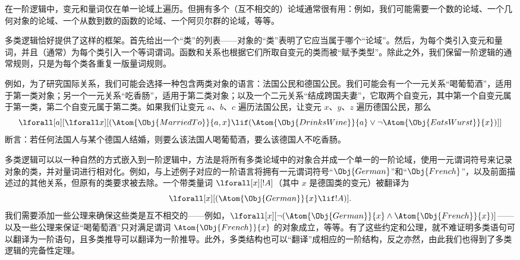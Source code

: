 \documentclass[../../../include/open-logic-section]{subfiles}
\begin{document}



在一阶逻辑中，变元和量词仅在单一论域上遍历。但拥有多个（互不相交的）论域通常很有用：例如，我们可能需要一个数的论域、一个几何对象的论域、一个从数到数的函数的论域、一个阿贝尔群的论域，等等。

多类逻辑恰好提供了这样的框架。首先给出一个“类”的列表——对象的“类”表明了它应当属于哪个“论域”。然后，为每个类引入变元和量词，并且（通常）为每个类引入一个等词谓词。函数和关系也根据它们所取自变元的类而被“赋予类型”。除此之外，我们保留一阶逻辑的通常规则，只是为每个类各重复一版量词规则。

例如，为了研究国际关系，我们可能会选择一种包含两类对象的语言：法国公民和德国公民。我们可能会有一个一元关系“喝葡萄酒”，适用于第一类对象；另一个一元关系“吃香肠”，适用于第二类对象；以及一个二元关系“结成跨国夫妻”，它取两个自变元，其中第一个自变元属于第一类，第二个自变元属于第二类。如果我们让变元 $a$、$b$、$c$ 遍历法国公民，让变元 $x$、$y$、$z$ 遍历德国公民，那么
\[
\lforall[a][\lforall x][(\Atom{\Obj{MarriedTo}}{a,x} \lif
(\Atom{\Obj{DrinksWine}}{a} \lor \lnot \Atom{\Obj{EatsWurst}}{x})]]
\]
断言：若任何法国人与某个德国人结婚，则要么该法国人喝葡萄酒，要么该德国人不吃香肠。

多类逻辑可以以一种自然的方式嵌入到一阶逻辑中，方法是将所有多类论域中的对象合并成一个单一的一阶论域，使用一元谓词符号来记录对象的类，并对量词进行相对化。例如，与上述例子对应的一阶语言将拥有一元谓词符号“$\Obj{German}$”和“$\Obj{French}$”，以及前面描述过的其他关系，但原有的类要求被去除。一个带类量词 $\lforall[x][!A]$（其中 $x$ 是德国类的变元）被翻译为
\[
\lforall[x][(\Atom{\Obj{German}}{x} \lif !A)].
\]
我们需要添加一些公理来确保这些类是互不相交的——例如，$\lforall[x][\lnot (\Atom{\Obj{German}}{x} \land
  \Atom{\Obj{French}}{x})]$——以及一些公理来保证“喝葡萄酒”只对满足谓词 $\Atom{\Obj{French}}{x}$ 的对象成立，等等。有了这些约定和公理，就不难证明多类语句可以翻译为一阶语句，且多类推导可以翻译为一阶推导。此外，多类结构也可以“翻译”成相应的一阶结构，反之亦然，由此我们也得到了多类逻辑的完备性定理。
\end{document}
